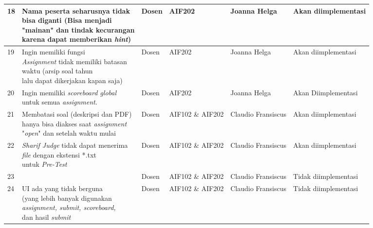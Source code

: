\begin{table}[H]
{\begin{tabular}{|l|l|l|l|l|l|}
		18 & \makecell[l]{Nama peserta seharusnya tidak \\ bisa diganti (Bisa menjadi \\ "mainan" dan tindak kecurangan \\ karena dapat memberikan \textit{hint})} & Dosen & AIF202 & Joanna Helga & Akan diimplementasi\\ \hline
		19 & \makecell[l]{Ingin memiliki fungsi \\ \textit{Assignment} tidak memiliki batasan \\ waktu (arsip soal tahun \\ lalu dapat dikerjakan kapan saja)} & Dosen & AIF202 & Joanna Helga & Akan diimplementasi\\ \hline
		20 & \makecell[l]{Ingin memiliki \textit{scoreboard global} \\ untuk semua \textit{assignment}.} & Dosen & AIF202 & Joanna Helga & Akan Diimplementasi\\ \hline
		21 & \makecell[l]{Membatasi soal (deskripsi dan PDF) \\ hanya bisa diakses saat \textit{assignment} \\ "\textit{open}" dan setelah waktu mulai} & Dosen & AIF102 \& AIF202 & Claudio Fransiscus & Akan diimplementasi\\ \hline
		22 & \makecell[l]{\textit{Sharif Judge} tidak dapat menerima \\ \textit{file} dengan ekstensi *.txt \\ untuk \textit{Pre-Test}} & Dosen & AIF102 \& AIF202 & Claudio Fransiscus & Akan diimplementasi\\ \hline
		23 & \makecell[l]{UI masih merepotkan} & Dosen & AIF102 \& AIF202 & Claudio Fransiscus & Tidak diimplementasi\\ \hline
		24 & \makecell[l]{UI ada yang tidak berguna \\ (yang lebih banyak digunakan \\ \textit{assignment, submit, scoreboard,} \\ dan hasil \textit{submit}} & Dosen & AIF102 \& AIF202 & Claudio Fransiscus & Tidak diimplementasi\\

		\hline
		
	\end{tabular}}
\end{table}

